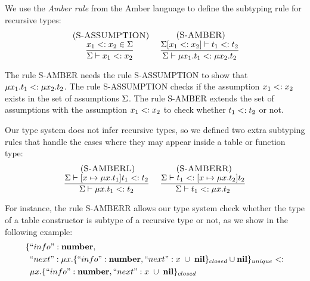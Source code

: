 We use the \emph{Amber rule} from the Amber language
\citep{cardelli1986amber} to define the subtyping rule for
recursive types:
\[
\begin{array}{c}
\begin{array}{c}
\; (\textsc{S-ASSUMPTION})\\
\dfrac{x_{1} <: x_{2} \in \Sigma}
      {\Sigma \vdash x_{1} <: x_{2}}
\end{array}
\;
\begin{array}{c}
\; (\textsc{S-AMBER})\\
\dfrac{\Sigma[x_{1} <: x_{2}] \vdash t_{1} <: t_{2}}
      {\Sigma \vdash \mu x_{1}.t_{1} <: \mu x_{2}.t_{2}}
\end{array}
\end{array}
\]

The rule \textsc{S-AMBER} needs the rule \textsc{S-ASSUMPTION}
to show that $\mu x_{1}.t_{1} <: \mu x_{2}.t_{2}$.
The rule \textsc{S-ASSUMPTION} checks if the assumption
$x_{1} <: x_{2}$ exists in the set of assumptions $\Sigma$.
The rule \textsc{S-AMBER} extends the set of assumptions
with the assumption $x_{1} <: x_{2}$ to check whether
$t_{1} <: t_{2}$ or not.

Our type system does not infer recursive types, so we defined two
extra subtyping rules that handle the cases where they may
appear inside a table or function type:
\[
\begin{array}{c}
\begin{array}{c}
\; (\textsc{S-AMBERL})\\
\dfrac{\Sigma \vdash [x \mapsto \mu x.t_{1}]t_{1} <: t_{2}}
      {\Sigma \vdash \mu x.t_{1} <: t_{2}}
\end{array}
\;
\begin{array}{c}
\; (\textsc{S-AMBERR})\\
\dfrac{\Sigma \vdash t_{1} <: [x \mapsto \mu x.t_{2}]t_{2}}
      {\Sigma \vdash t_{1} <: \mu x.t_{2}}
\end{array}
\end{array}
\]

For instance, the rule \textsc{S-AMBERR} allows our type system
check whether the type of a table constructor is subtype of
a recursive type or not, as we show in the following example:
\begin{align*}
\{ & ``info":\mathbf{number}, \\
   & ``next":\mu x.\{``info":\mathbf{number}, ``next":x \;\cup\; \mathbf{nil}\}_{closed} \cup \mathbf{nil} \}_{unique} <: \\
& \mu x.\{``info":\mathbf{number}, ``next":x \;\cup\; \mathbf{nil}\}_{closed}
\end{align*}

